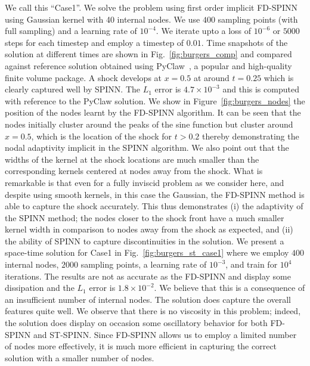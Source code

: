\documentclass[12pt]{article}
\newcommand{\rb}[1]{#1}
\newcommand{\new}[1]{#1}
\newcommand{\rR}[1]{#1}
\begin{document}
\rb{We call this ``Case1''.} We solve the problem using first order implicit FD-SPINN using Gaussian kernel with 40 internal nodes. \rb{We use $400$ sampling points (with full sampling) and a learning rate of $10^{-4}$. We iterate upto a loss of $10^{-6}$ or $5000$ steps for each timestep and employ a timestep of $0.01$.}  Time snapshots of the solution at different times are shown in Fig.~\ref{fig:burgers_comp} and compared against reference solution obtained using PyClaw~\cite{pyclaw}, a popular and high-quality finite volume package. A shock develops at $x=0.5$ at around $t=0.25$ which is clearly captured well by SPINN. \rR{The $L_1$ error is $4.7 \times 10^{-3}$ and this is computed with reference to the PyClaw solution.} We show in Figure~\ref{fig:burgers_nodes} the position of the nodes learnt by the FD-SPINN algorithm.  It can be seen that the nodes initially cluster around the peaks of the sine function but cluster around $x=0.5$, which is the location of the shock for $t> 0.2$ thereby demonstrating the nodal adaptivity implicit in the SPINN algorithm. We also point out that the widths of the kernel at the shock locations are much smaller than the corresponding kernels centered at nodes away from the shock. What is remarkable is that \new{even for a fully inviscid problem as we consider here}, and despite using smooth kernels, in this case the Gaussian, the FD-SPINN method is able to capture the shock accurately. This thus demonstrates (i) the adaptivity of the SPINN method; the nodes closer to the shock front have a much smaller kernel width in comparison to nodes away from the shock as expected, and (ii) the ability of SPINN to capture discontinuities in the solution. \rb{We present a space-time solution for Case1 in Fig.~\ref{fig:burgers_st_case1} where we employ $400$ internal nodes, $2000$ sampling points, a learning rate of $10^{-3}$, and train for $10^4$ iterations.  The results are not as accurate as the FD-SPINN and display some dissipation \rR{and the $L_1$ error is $1.8 \times 10^{-2}$}.  We believe that this is a consequence of an insufficient number of internal nodes.  The solution does capture the overall features quite well.  We observe that there is no viscosity in this problem; indeed, the solution does display on occasion some oscillatory behavior for both FD-SPINN and ST-SPINN.  Since FD-SPINN allows us to employ a limited number of nodes more effectively, it is much more efficient in capturing the correct solution with a smaller number of nodes.}
\end{document}
